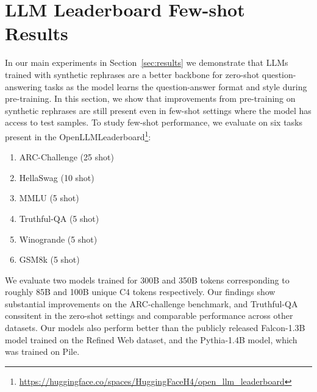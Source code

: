 \documentclass[table]{article}
\begin{document}
\section{LLM Leaderboard Few-shot Results}
In our main experiments in Section~\ref{sec:results} we demonstrate that LLMs trained with synthetic rephrases are a better backbone for  zero-shot question-answering tasks as the model learns the question-answer format and style during pre-training.  In this section, we show that improvements from pre-training on synthetic rephrases are still present even in few-shot settings where the model has access to test samples.  To study few-shot performance, we evaluate on six tasks present in the OpenLLMLeaderboard\footnote{\url{https://huggingface.co/spaces/HuggingFaceH4/open\_llm\_leaderboard}}:

\begin{enumerate}
    \item ARC-Challenge (25 shot)
    \item HellaSwag (10 shot)
    \item MMLU (5 shot)
    \item Truthful-QA (5 shot)
    \item Winogrande (5 shot)
    \item GSM8k (5 shot)
\end{enumerate}

We evaluate two models trained for 300B and 350B tokens corresponding to roughly 85B and 100B unique C4 tokens respectively.  Our findings show substantial improvements on the ARC-challenge benchmark, and Truthful-QA conssitent in the zero-shot settings and comparable performance across other datasets.  Our models also perform better than the publicly released Falcon-1.3B model trained on the Refined Web dataset, and the Pythia-1.4B model, which was trained on Pile.  

\begin{table}
    \centering
    \caption{1.3B 300K LLM Leaderboard Eval. Evaluation is done on a single seed (1234).}
    \label{tab:llm_leaderboard}
\end{table}
\end{document}
